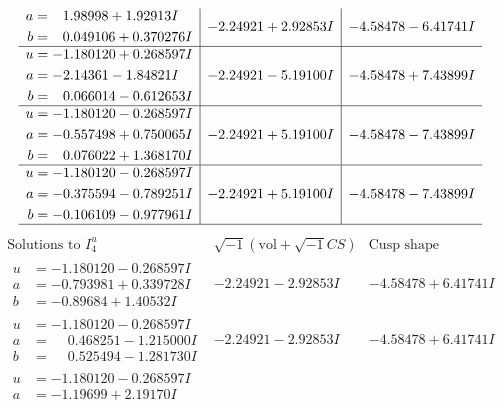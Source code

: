 \documentclass[1p]{elsarticle_modified}
\theoremstyle{definition}
\newcommand{\I}{\sqrt{-1}}
\begin{document}
$$\begin{array}{c|c|c}
\begin{aligned}
a &= \phantom{-}1.98998 + 1.92913 I \\
b &= \phantom{-}0.049106 + 0.370276 I\end{aligned}
 & -2.24921 + 2.92853 I & -4.58478 - 6.41741 I \\ \hline\begin{aligned}
u &= -1.180120 + 0.268597 I \\
a &= -2.14361 - 1.84821 I \\
b &= \phantom{-}0.066014 - 0.612653 I\end{aligned}
 & -2.24921 - 5.19100 I & -4.58478 + 7.43899 I \\ \hline\begin{aligned}
u &= -1.180120 - 0.268597 I \\
a &= -0.557498 + 0.750065 I \\
b &= \phantom{-}0.076022 + 1.368170 I\end{aligned}
 & -2.24921 + 5.19100 I & -4.58478 - 7.43899 I \\ \hline\begin{aligned}
u &= -1.180120 - 0.268597 I \\
a &= -0.375594 - 0.789251 I \\
b &= -0.106109 - 0.977961 I\end{aligned}
 & -2.24921 + 5.19100 I & -4.58478 - 7.43899 I\\
 \hline 
 \end{array}$$\newpage$$\begin{array}{c|c|c}  
\text{Solutions to }I^u_{4}& \I (\text{vol} + \sqrt{-1}CS) & \text{Cusp shape}\\
 \hline 
\begin{aligned}
u &= -1.180120 - 0.268597 I \\
a &= -0.793981 + 0.339728 I \\
b &= -0.89684 + 1.40532 I\end{aligned}
 & -2.24921 - 2.92853 I & -4.58478 + 6.41741 I \\ \hline\begin{aligned}
u &= -1.180120 - 0.268597 I \\
a &= \phantom{-}0.468251 - 1.215000 I \\
b &= \phantom{-}0.525494 - 1.281730 I\end{aligned}
 & -2.24921 - 2.92853 I & -4.58478 + 6.41741 I \\ \hline\begin{aligned}
u &= -1.180120 - 0.268597 I \\
a &= -1.19699 + 2.19170 I \\

\end{aligned}
\end{array}$$
\end{document}
